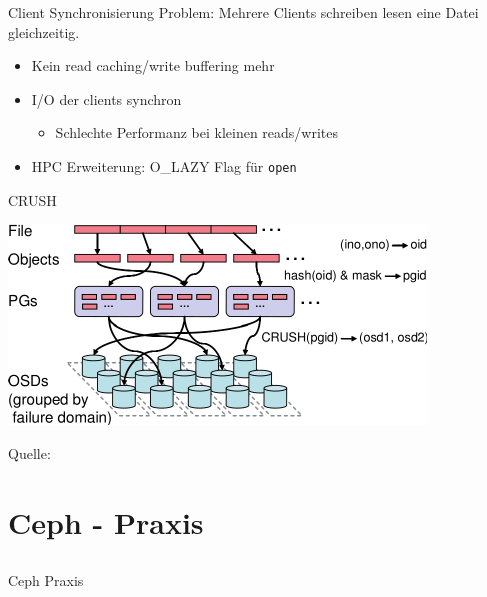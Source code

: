 \documentclass[notes=hide,yellow]{beamer}
\begin{document}
\begin{frame}{Client Synchronisierung}
	Problem: Mehrere Clients schreiben lesen eine Datei gleichzeitig.

	\begin{itemize}	
		\item Kein read caching/write buffering mehr
		\item I/O der clients synchron %
			\begin{itemize}
				\item Schlechte Performanz bei kleinen reads/writes
			\end{itemize}
		\item HPC Erweiterung: O\_LAZY Flag f\"ur \texttt{open}
	\end{itemize}
\end{frame}


\begin{frame}{CRUSH}
	\begin{center}
	\includegraphics{crush.pdf}
	\end{center}
	Quelle: \cite{weil2006}
\end{frame}

\section{Ceph - Praxis}
\subsection*{}

\begin{frame}
	\begin{center}
	\Large{Ceph Praxis}
	\end{center}
\end{frame}
\end{document}
